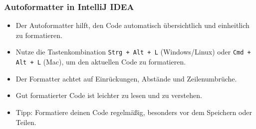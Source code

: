 \documentclass{../../presentation}
\begin{document}
\begin{frame}
  \frametitle{Autoformatter in IntelliJ IDEA}
  \begin{itemize}
    \item Der Autoformatter hilft, den Code automatisch übersichtlich und einheitlich zu formatieren.
    \item Nutze die Tastenkombination \texttt{Strg + Alt + L} (Windows/Linux) oder \texttt{Cmd + Alt + L} (Mac), um den aktuellen Code zu formatieren.
    \item Der Formatter achtet auf Einrückungen, Abstände und Zeilenumbrüche.
    \item Gut formatierter Code ist leichter zu lesen und zu verstehen.
    \item Tipp: Formatiere deinen Code regelmäßig, besonders vor dem Speichern oder Teilen.
  \end{itemize}
\end{frame}
\end{document}
